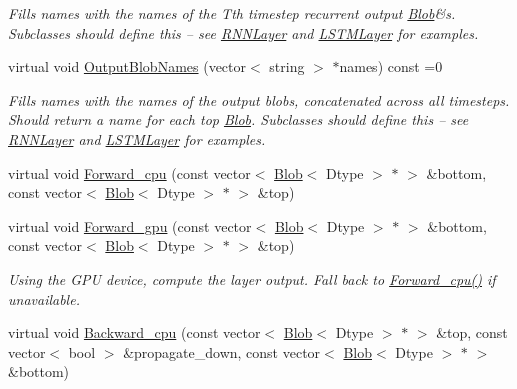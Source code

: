 \begin{DoxyCompactItemize}
\begin{DoxyCompactList}\small\item\em Fills names with the names of the Tth timestep recurrent output \hyperlink{classcaffe_1_1Blob}{Blob}\&s. Subclasses should define this -- see \hyperlink{classcaffe_1_1RNNLayer}{R\+N\+N\+Layer} and \hyperlink{classcaffe_1_1LSTMLayer}{L\+S\+T\+M\+Layer} for examples. \end{DoxyCompactList}\item 
virtual void \hyperlink{classcaffe_1_1RecurrentLayer_af0b87f8e9a422338243ffeb7f16121fa}{Output\+Blob\+Names} (vector$<$ string $>$ $\ast$names) const =0\hypertarget{classcaffe_1_1RecurrentLayer_af0b87f8e9a422338243ffeb7f16121fa}{}\label{classcaffe_1_1RecurrentLayer_af0b87f8e9a422338243ffeb7f16121fa}

\begin{DoxyCompactList}\small\item\em Fills names with the names of the output blobs, concatenated across all timesteps. Should return a name for each top \hyperlink{classcaffe_1_1Blob}{Blob}. Subclasses should define this -- see \hyperlink{classcaffe_1_1RNNLayer}{R\+N\+N\+Layer} and \hyperlink{classcaffe_1_1LSTMLayer}{L\+S\+T\+M\+Layer} for examples. \end{DoxyCompactList}\item 
virtual void \hyperlink{classcaffe_1_1RecurrentLayer_af914a79d0cd024d6962b75325ab5ee94}{Forward\+\_\+cpu} (const vector$<$ \hyperlink{classcaffe_1_1Blob}{Blob}$<$ Dtype $>$ $\ast$ $>$ \&bottom, const vector$<$ \hyperlink{classcaffe_1_1Blob}{Blob}$<$ Dtype $>$ $\ast$ $>$ \&top)
\item 
virtual void \hyperlink{classcaffe_1_1RecurrentLayer_a824c38cd40b7743a45882b14c64377bc}{Forward\+\_\+gpu} (const vector$<$ \hyperlink{classcaffe_1_1Blob}{Blob}$<$ Dtype $>$ $\ast$ $>$ \&bottom, const vector$<$ \hyperlink{classcaffe_1_1Blob}{Blob}$<$ Dtype $>$ $\ast$ $>$ \&top)\hypertarget{classcaffe_1_1RecurrentLayer_a824c38cd40b7743a45882b14c64377bc}{}\label{classcaffe_1_1RecurrentLayer_a824c38cd40b7743a45882b14c64377bc}

\begin{DoxyCompactList}\small\item\em Using the G\+PU device, compute the layer output. Fall back to \hyperlink{classcaffe_1_1RecurrentLayer_af914a79d0cd024d6962b75325ab5ee94}{Forward\+\_\+cpu()} if unavailable. \end{DoxyCompactList}\item 
virtual void \hyperlink{classcaffe_1_1RecurrentLayer_a43ed5f8fce46753bf6a928d6d126d287}{Backward\+\_\+cpu} (const vector$<$ \hyperlink{classcaffe_1_1Blob}{Blob}$<$ Dtype $>$ $\ast$ $>$ \&top, const vector$<$ bool $>$ \&propagate\+\_\+down, const vector$<$ \hyperlink{classcaffe_1_1Blob}{Blob}$<$ Dtype $>$ $\ast$ $>$ \&bottom)\hypertarget{classcaffe_1_1RecurrentLayer_a43ed5f8fce46753bf6a928d6d126d287}{}\label{classcaffe_1_1RecurrentLayer_a43ed5f8fce46753bf6a928d6d126d287}


\end{DoxyCompactItemize}

